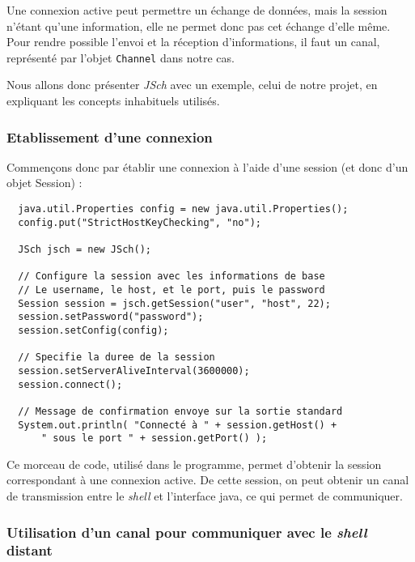 \par Une connexion active peut permettre un échange de données, mais la session n'étant qu'une information, elle ne permet donc pas cet échange d'elle même. Pour rendre possible l'envoi et la réception d'informations, il faut un canal, représenté par l'objet \texttt{Channel} dans notre cas.

\par Nous allons donc présenter \emph{JSch} avec un exemple, celui de notre projet, en expliquant les concepts inhabituels utilisés.

\subsubsection{Etablissement d'une connexion}
\label{sec:etabl-dune-conn}

\par Commençons donc par établir une connexion à l'aide d'une session (et donc d'un objet Session) :

\begin{verbatim}
  java.util.Properties config = new java.util.Properties(); 
  config.put("StrictHostKeyChecking", "no");
  
  JSch jsch = new JSch();

  // Configure la session avec les informations de base
  // Le username, le host, et le port, puis le password
  Session session = jsch.getSession("user", "host", 22);
  session.setPassword("password");
  session.setConfig(config);

  // Specifie la duree de la session
  session.setServerAliveInterval(3600000);
  session.connect();

  // Message de confirmation envoye sur la sortie standard
  System.out.println( "Connecté à " + session.getHost() + 
      " sous le port " + session.getPort() );
\end{verbatim}

\par Ce morceau de code, utilisé dans le programme, permet d'obtenir la session correspondant à une connexion active. De cette session, on peut obtenir un canal de transmission entre le \emph{shell} et l'interface java, ce qui permet de communiquer.

\subsubsection{Utilisation d'un canal pour communiquer avec le \emph{shell} distant}
\label{sec:util-dun-canal}

